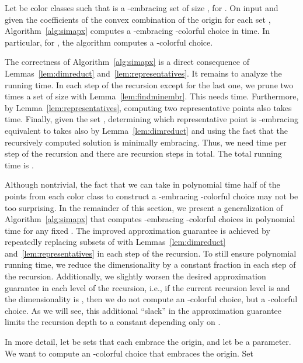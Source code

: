 \begin{theorem}\label{thm:simpledimreduct}
  Let  be
   color classes such that  is a -embracing set
  of size , for . On input  and given the
  coefficients of the convex combination of the origin for each set ,
  Algorithm~\ref{alg:simapx} computes a -embracing -colorful choice in  time.
  In particular, for , the algorithm 
  computes a -colorful choice.
\end{theorem}
\begin{prf}
  The correctness of Algorithm~\ref{alg:simapx} is a direct consequence of
  Lemmas~\ref{lem:dimreduct} and~\ref{lem:representatives}. It remains to
  analyze the running time. In each step of the recursion except for the 
  last one, we prune two times a set of size  with
  Lemma~\ref{lem:findminembr}. This needs  time. Furthermore, by
  Lemma~\ref{lem:representatives}, computing two representative points 
  also takes  time. Finally, given the set , determining which
  representative point is -embracing equivalent to  takes also 
   by Lemma~\ref{lem:dimreduct} and using the fact that
  the recursively computed solution is minimally embracing. Thus, we 
  need  time per step of the recursion and there are 
   recursion steps in total. The total running time is 
  .
\end{prf}

Although nontrivial, the fact that we can take in polynomial time 
half of the points from each color class to construct a -embracing
-colorful choice may not be too 
surprising.  In the remainder of this section, we present a 
generalization of Algorithm~\ref{alg:simapx} that computes 
-embracing -colorful choices in 
polynomial time for any fixed . The improved approximation
guarantee is achieved by repeatedly replacing subsets of  with
Lemmas~\ref{lem:dimreduct} and~\ref{lem:representatives} in each 
step of the recursion. To still ensure polynomial running time, we 
reduce the dimensionality by a constant fraction in each step of 
the recursion. Additionally, we slightly worsen the desired 
approximation guarantee in each level of the recursion, i.e., if the
current recursion level is  and the dimensionality is , then 
we do not compute an -colorful
choice, but a -colorful
choice. As we will see, this additional ``slack'' in the approximation 
guarantee limits the recursion depth to a constant depending only on 
. 

In more detail, let  be  sets that each
embrace the origin, and let  be a parameter. We want to compute 
an -colorful choice that embraces the origin. 
Set

